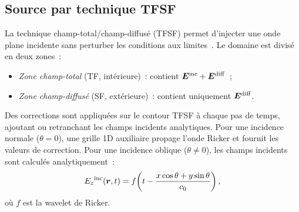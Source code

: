 \documentclass[12pt,a4paper]{article}
\newcommand{\vE}{\bm{E}}
\newcommand{\Ez}{{E_z}}
\begin{document}
\subsection{Source par technique TFSF}
\label{ssec:tfsf}

La technique champ-total/champ-diffusé (TFSF) permet d'injecter une onde plane
incidente sans perturber les conditions aux limites~\cite{Umashankar1982,Merewether1980}.
Le domaine est divisé en deux zones~:
\begin{itemize}
    \item \textit{Zone champ-total} (TF, intérieure)~: contient $\vE^{\rm inc} + \vE^{\rm diff}$~;
    \item \textit{Zone champ-diffusé} (SF, extérieure)~: contient uniquement $\vE^{\rm diff}$.
\end{itemize}

Des corrections sont appliquées sur le contour TFSF à chaque pas de temps, ajoutant
ou retranchant les champs incidents analytiques. Pour une incidence normale ($\theta=0$),
une grille 1D auxiliaire propage l'onde Ricker et fournit les valeurs de correction.
Pour une incidence oblique ($\theta \neq 0$), les champs incidents sont calculés
analytiquement~:
\begin{equation}
    \Ez^{\rm inc}(\bm{r}, t) = f\!\left(t - \frac{x\cos\theta + y\sin\theta}{c_0}\right),
    \label{eq:tfsf-oblique}
\end{equation}
où $f$ est la wavelet de Ricker.
\end{document}
